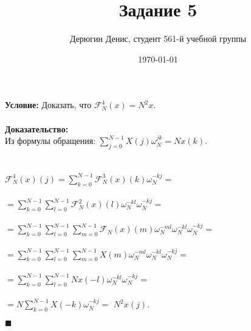 \documentclass{article}
\title{Задание 5}
\author{
	Дерюгин Денис, студент 561-й учебной группы
}
\date{\today}
\newcommand\proofend{\begin{flushright}$\blacksquare$\end{flushright}}
\begin{document}
\maketitle
\large{
	\textbf{Условие:} Доказать, что $\mathcal{F}_N^4(x) = N^2x$.\\
	\\
	\textbf{Доказательство:} \\
	Из формулы обращения: $\sum\limits_{j = 0}^{N - 1} X(j)\omega_N^{jk} = Nx(k)$. \\ \\ \\

	$\mathcal{F}_N^4(x)(j) = \sum\limits_{k = 0}^{N - 1} \mathcal{F}_N^3(x)(k)\omega_N^{-kj} = $ \\ \\
	$ = \sum\limits_{k = 0}^{N - 1} \sum\limits_{l = 0}^{N - 1} \mathcal{F}_N^2(x)(l)\omega_N^{-kl}\omega_N^{-kj} = $ \\ \\
	$ = \sum\limits_{k = 0}^{N - 1} \sum\limits_{l = 0}^{N - 1} \sum\limits_{m = 0}^{N - 1} \mathcal{F}_N(x)(m)\omega_N^{-ml}\omega_N^{-kl}\omega_N^{-kj} = $ \\ \\
	$ = \sum\limits_{k = 0}^{N - 1} \sum\limits_{l = 0}^{N - 1} \sum\limits_{m = 0}^{N - 1} X(m)\omega_N^{-ml}\omega_N^{-kl}\omega_N^{-kj} = $ \\ \\
	$ = \sum\limits_{k = 0}^{N - 1} \sum\limits_{l = 0}^{N - 1} Nx(-l)\omega_N^{-kl}\omega_N^{-kj} = $ \\ \\
	$ = N\sum\limits_{k = 0}^{N - 1} X(-k)\omega_N^{-kj} = $
	$ N^2x(j)$.

	\proofend

}
\end{document}
